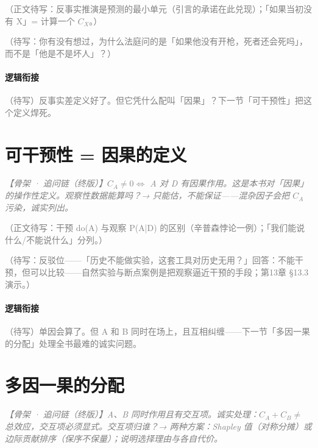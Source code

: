 \documentclass[../../main2.tex]{subfiles}
\begin{document}
	\textcolor{gray}{（正文待写：反事实推演是预测的最小单元（引言的承诺在此兑现）；「如果当初没有 X」= 计算一个 $C_X$。）}

	\begin{readingnote}
		\textcolor{gray}{（待写：你有没有想过，为什么法庭问的是「如果他没有开枪，死者还会死吗」，而不是「他是不是坏人」？）}
	\end{readingnote}

	\paragraph*{逻辑衔接}
	\textcolor{gray}{（待写）反事实差定义好了。但它凭什么配叫「因果」？下一节「可干预性」把这个定义焊死。}

	\section{可干预性 = 因果的定义}
	\label{sec:contrib-intervene}

	\textcolor{gray}{\textit{【骨架 · 追问链（终版）】$C_A \neq 0 \iff$ A 对 D 有因果作用。这是本书对「因果」的操作性定义。观察性数据能算吗？→ 只能估，不能保证——混杂因子会把 $C_A$ 污染，诚实列出。}}

	\textcolor{gray}{（正文待写：干预 do(A) 与观察 P(A|D) 的区别（辛普森悖论一例）；「我们能说什么/不能说什么」分列。）}

	\begin{questionbox}
		\textcolor{gray}{（待写：反驳位——「历史不能做实验，这套工具对历史无用？」回答：不能干预，但可以比较——自然实验与断点案例是把观察逼近干预的手段；第13章 §13.3 演示。）}
	\end{questionbox}

	\paragraph*{逻辑衔接}
	\textcolor{gray}{（待写）单因会算了。但 A 和 B 同时在场上，且互相纠缠——下一节「多因一果的分配」处理全书最难的诚实问题。}

	\section{多因一果的分配}
	\label{sec:contrib-interaction}

	\textcolor{gray}{\textit{【骨架 · 追问链（终版）】A、B 同时作用且有交互项。诚实处理：$C_A + C_B \neq$ 总效应，交互项必须显式。交互项归谁？→ 两种方案：Shapley 值（对称分摊）或边际贡献排序（保序不保量）；说明选择理由与各自代价。}}
\end{document}
